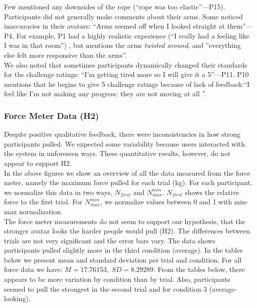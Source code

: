 Few mentioned any downsides of the rope (``rope was too elastic''---P15).\\
Participants did not generally make comments about their arms. Some noticed inaccuracies in their avatars: ``Arms seemed off when I looked straight at them''---P4. For example, P1 had a highly realistic experience (``I really had a feeling like I was in that room'') , but mentions the arms \textit{twisted around}, and ''everything else felt more responsive than the arms''. \\
We also noted that sometimes participants dynamically changed their standards for the challenge ratings: ``I'm getting tired more so I will give it a 5''---P11. P10 mentions that he begins to give 5 challenge ratings because of lack of feedback:``I feel like I'm not making any progress; they are not moving at all ''.

\subsubsection{Force Meter Data (H2)}
Despite positive qualitative feedback, there were inconsistencies in how strong participants pulled. We expected some variability because users interacted with the system in unforeseen ways. These quantitative results, however, do not appear to support H2.\\
In the above figures we show an overview of all the data measured from the force meter, namely the maximum force pulled for each trial (kg). For each participant, we normalize this data in two ways, $N_{first}$ and $N_{max}^{min}$. $N_{first}$ shows the relative force to the first trial. For $N_{max}^{min}$, we normalize values between 0 and 1 with min-max normalization.
\\
The force meter measurements do not seem to support our hypothesis, that the stronger avatar looks the harder people would pull (H2). The differences between trials are not very significant and the error bars vary. The data shows participants pulled slightly more in the third condition (average). In the tables below we present mean and standard deviation per trial and condition. For all force data we have: $M= 17.76153, \; SD=8.29289$.
From the tables below, there appears to be more variation by condition than by trial. Also, participants seemed to pull the strongest in the second trial and for condition 3 (average-looking).

